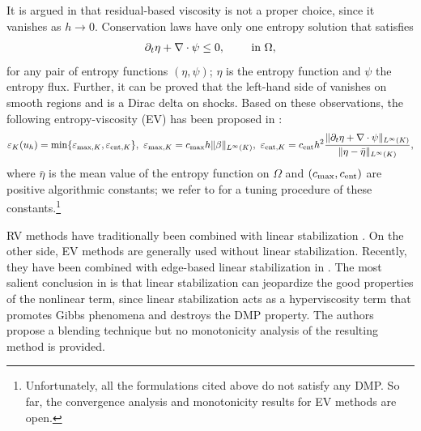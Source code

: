 It is argued in \cite[Remark 2.2]{guermond_entropy_2011} that residual-based viscosity is not a proper choice, since it vanishes
as $h \rightarrow 0$. Conservation laws have only one entropy solution 
\cite{lefloch_hyperbolic_2002} that satisfies 
\begin{align}\label{eq-entinq}
\partial_t \eta + \nabla \cdot \psi \leq 0, \qquad \hbox{ in } \Omega, 
\end{align}
for any pair of entropy functions $(\eta,\psi)$; $\eta$ is the entropy function and $\psi$ the entropy flux. Further, it can be proved that the left-hand side of  vanishes on smooth regions and is a Dirac delta on shocks. Based on these observations, the following entropy-viscosity (EV) has been proposed in \cite{guermond_entropy_2011}:
\begin{align}\label{eq-ev}%
\varepsilon_K(u_h) = \min \{ \varepsilon_{{\rm max},K}, \varepsilon_{{\rm ent},K}\}, \mbox{ }
\varepsilon_{{\rm max},K} = c_{\rm max} h \|\beta\|_{L^\infty(K)}, \mbox{ }
\varepsilon_{{\rm ent},K} = c_{\rm ent} h^2 \frac{\|\partial_t \eta + \nabla \cdot \psi\|_{L^\infty(K)}}{\|\eta - \bar{\eta}  \|_{L^\infty(K)}},
\end{align}
where $\bar{\eta}$ is the mean value of the entropy function on $\Omega$ and $(c_{\rm max},c_{\rm ent})$ are positive algorithmic constants; we refer to \cite{guermond_entropy_2011} for a tuning procedure of these constants.\footnote{Unfortunately, all the formulations cited above do not satisfy any DMP. So far, the convergence analysis and monotonicity results for EV methods are open.} %

RV methods have traditionally been combined with linear stabilization \cite{codina_discontinuity-capturing_1993,john_spurious_2007,john_spurious_2008,galeao_consistent_1988,gomes_dutra_do_carmo_feedback_1991}. 
On the other side, EV methods are generally used without linear stabilization. Recently, they have been combined with edge-based linear stabilization in \cite{ern_weighting_2012}. The most salient conclusion in \cite{ern_weighting_2012} is that linear 
stabilization can jeopardize the good properties of the nonlinear term, since linear stabilization acts as a hyperviscosity term that promotes Gibbs phenomena and 
destroys the DMP property. The authors propose a blending technique but no monotonicity analysis of the resulting method is provided.

